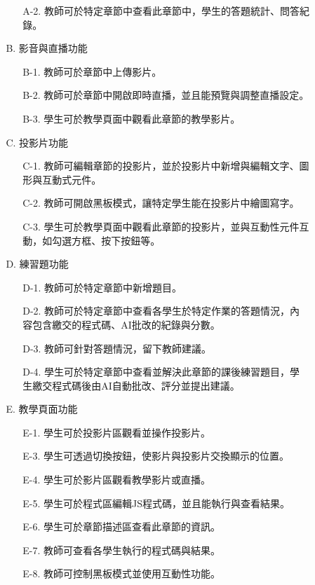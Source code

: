 \documentclass[12pt]{article}
\begin{document}
\begin{enumerate}
\begin{enumerate}
\begin{enumerate}
\begin{enumerate}
              \item [A-2.] 教師可於特定章節中查看此章節中，學生的答題統計、問答紀錄。
            \end{enumerate}
          \item [B.] 影音與直播功能
            \begin{enumerate}
              \item [B-1.] 教師可於章節中上傳影片。
              \item [B-2.] 教師可於章節中開啟即時直播，並且能預覽與調整直播設定。
              \item [B-3.] 學生可於教學頁面中觀看此章節的教學影片。
            \end{enumerate}
          \item [C.] 投影片功能
            \begin{enumerate}
              \item [C-1.] 教師可編輯章節的投影片，並於投影片中新增與編輯文字、圖形與互動式元件。
              \item [C-2.] 教師可開啟黑板模式，讓特定學生能在投影片中繪圖寫字。
              \item [C-3.] 學生可於教學頁面中觀看此章節的投影片，並與互動性元件互動，如勾選方框、按下按鈕等。
            \end{enumerate}
          \item [D.] 練習題功能
            \begin{enumerate}
              \item [D-1.] 教師可於特定章節中新增題目。
              \item [D-2.] 教師可於特定章節中查看各學生於特定作業的答題情況，內容包含繳交的程式碼、AI批改的紀錄與分數。
              \item [D-3.] 教師可針對答題情況，留下教師建議。
              \item [D-4.] 學生可於特定章節中查看並解決此章節的課後練習題目，學生繳交程式碼後由AI自動批改、評分並提出建議。
            \end{enumerate}
          \item [E.] 教學頁面功能
            \begin{enumerate}
              \item [E-1.] 學生可於投影片區觀看並操作投影片。
              \item [E-3.] 學生可透過切換按鈕，使影片與投影片交換顯示的位置。
              \item [E-4.] 學生可於影片區觀看教學影片或直播。
              \item [E-5.] 學生可於程式區編輯JS程式碼，並且能執行與查看結果。
              \item [E-6.] 學生可於章節描述區查看此章節的資訊。
              \item [E-7.] 教師可查看各學生執行的程式碼與結果。
              \item [E-8.] 教師可控制黑板模式並使用互動性功能。
            \end{enumerate}
          \end{enumerate}


\end{enumerate}
\end{enumerate}
\end{document}
